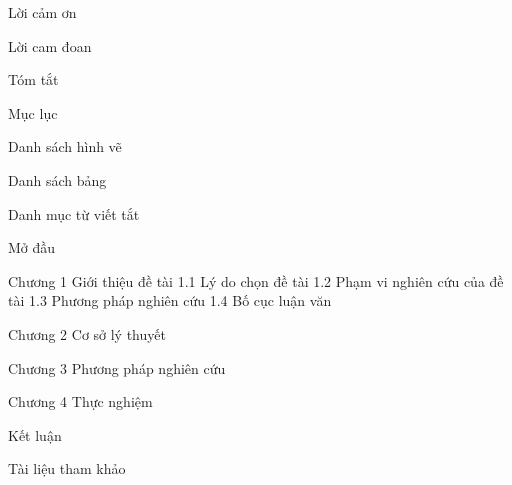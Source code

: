 Lời cảm ơn

Lời cam đoan

Tóm tắt

Mục lục

Danh sách hình vẽ

Danh sách bảng

Danh mục từ viết tắt

Mở đầu

Chương 1 Giới thiệu đề tài
1.1 Lý do chọn đề tài
1.2 Phạm vi nghiên cứu của đề tài 
1.3 Phương pháp nghiên cứu
1.4 Bố cục luận văn

Chương 2 Cơ sở lý thuyết

Chương 3 Phương pháp nghiên cứu

Chương 4 Thực nghiệm

Kết luận

Tài liệu tham khảo